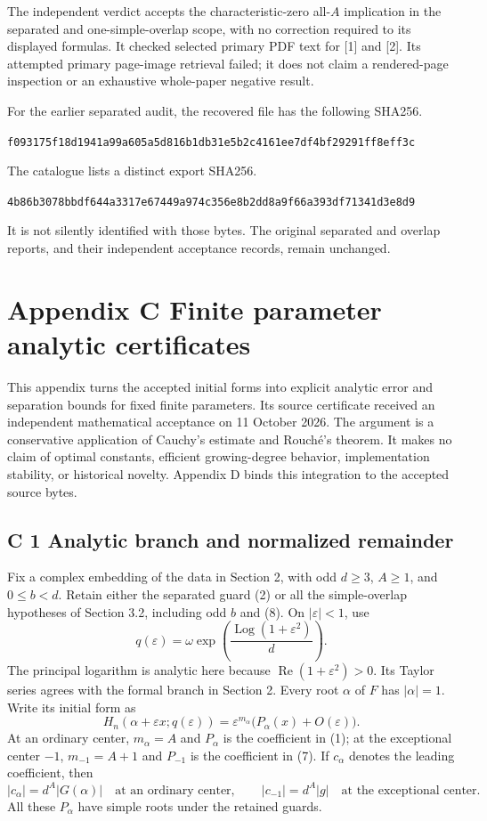 \documentclass[
  11pt,
]{article}
\begin{document}
The independent verdict accepts the characteristic-zero all-\(A\)
implication in the separated and one-simple-overlap scope, with no
correction required to its displayed formulas. It checked selected
primary PDF text for {[}1{]} and {[}2{]}. Its attempted primary
page-image retrieval failed; it does not claim a rendered-page
inspection or an exhaustive whole-paper negative result.

For the earlier separated audit, the recovered file has the following
SHA256.

\texttt{f093175f18d1941a99a605a5d816b1db31e5b2c4161ee7df4bf29291ff8eff3c}

The catalogue lists a distinct export SHA256.

\texttt{4b86b3078bbdf644a3317e67449a974c356e8b2dd8a9f66a393df71341d3e8d9}

It is not silently identified with those bytes. The original separated
and overlap reports, and their independent acceptance records, remain
unchanged.

\clearpage
\section{Appendix C Finite parameter analytic certificates}
\label{appendix-c-finite-certificates}

This appendix turns the accepted initial forms into explicit analytic
error and separation bounds for fixed finite parameters. Its source
certificate received an independent mathematical acceptance on
11 October 2026. The argument is a conservative application of Cauchy's
estimate and Rouch\'e's theorem. It makes no claim of optimal constants,
efficient growing-degree behavior, implementation stability, or historical
novelty. Appendix D binds this integration to the accepted source bytes.

\subsection{C 1 Analytic branch and normalized remainder}

Fix a complex embedding of the data in Section 2, with odd \(d\geq3\),
\(A\geq1\), and \(0\leq b<d\). Retain either the separated guard (2)
or all the simple-overlap hypotheses of Section 3.2, including odd \(b\)
and (8). On \(|\varepsilon|<1\), use
\[
q(\varepsilon)=\omega\exp\!\left(\frac{\operatorname{Log}(1+\varepsilon^2)}d\right).
\]
The principal logarithm is analytic here because
\(\operatorname{Re}(1+\varepsilon^2)>0\). Its Taylor series agrees with
the formal branch in Section 2. Every root \(\alpha\) of \(F\) has
\(|\alpha|=1\). Write its initial form as
\[
H_n(\alpha+\varepsilon x;q(\varepsilon))
=\varepsilon^{m_\alpha}\bigl(P_\alpha(x)+O(\varepsilon)\bigr).
\tag{C1}
\]
At an ordinary center, \(m_\alpha=A\) and \(P_\alpha\) is the
coefficient in (1); at the exceptional center \(-1\),
\(m_{-1}=A+1\) and \(P_{-1}\) is the coefficient in (7).
If \(c_\alpha\) denotes the leading coefficient, then
\[
|c_\alpha|=d^A|G(\alpha)|\quad\text{at an ordinary center},
\qquad |c_{-1}|=d^A|g|\quad\text{at the exceptional center}.
\]
All these \(P_\alpha\) have simple roots under the retained guards.
\end{document}
